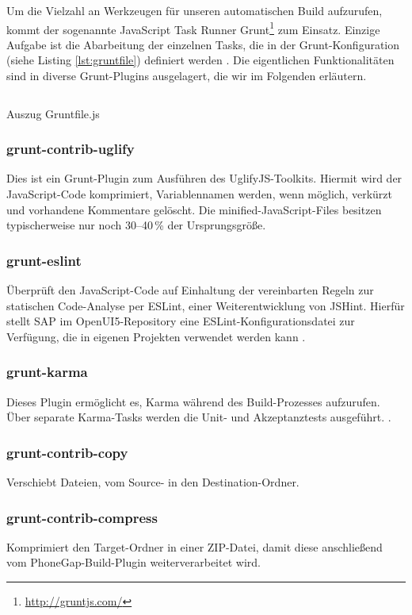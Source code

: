 Um die Vielzahl an Werkzeugen für unseren automatischen Build aufzurufen, kommt der sogenannte JavaScript Task Runner Grunt\footnote{\url{http://gruntjs.com/}} zum Einsatz. Einzige Aufgabe ist die Abarbeitung der einzelnen Tasks, die in der Grunt-Konfiguration (siehe Listing \ref{lst:gruntfile}) definiert werden \cite[S.\ 59-61]{Wrobel2015}. Die eigentlichen Funktionalitäten sind in diverse Grunt-Plugins ausgelagert, die wir im Folgenden erläutern.

\begin{listing}
	\inputminted{javascript}{src/gruntfile-short.js}
	\caption{Auszug Gruntfile.js}
	\label{lst:gruntfile}
\end{listing}

\subsubsection{grunt-contrib-uglify}
Dies ist ein Grunt-Plugin zum Ausführen des UglifyJS-Toolkits. Hiermit wird der JavaScript-Code komprimiert, Variablennamen werden, wenn möglich, verkürzt und vorhandene Kommentare gelöscht. Die minified-JavaScript-Files besitzen typischerweise nur noch 30--40\,\% der Ursprungsgröße.

\subsubsection{grunt-eslint}
Überprüft den JavaScript-Code auf Einhaltung der vereinbarten Regeln zur statischen Code-Analyse per ESLint, einer Weiterentwicklung von JSHint. Hierfür stellt SAP im OpenUI5-Repository eine ESLint-Konfigurationsdatei zur Verfügung, die in eigenen Projekten verwendet werden kann \cite{SAP2015_2}.

\subsubsection{grunt-karma}
Dieses Plugin ermöglicht es, Karma während des Build-Prozesses aufzurufen. Über separate Karma-Tasks werden die Unit- und Akzeptanztests ausgeführt. \cite[S.\ 129-130]{Wrobel2015}.

\subsubsection{grunt-contrib-copy}
Verschiebt Dateien, \zB vom Source- in den Destination-Ordner.

\subsubsection{grunt-contrib-compress}
Komprimiert den Target-Ordner in einer ZIP-Datei, damit diese anschließend vom PhoneGap-Build-Plugin weiterverarbeitet wird.

